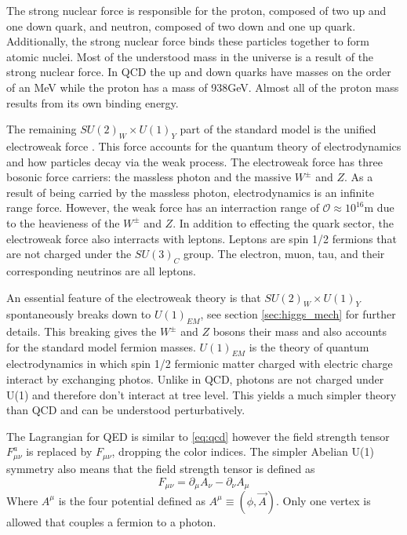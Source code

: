 The strong nuclear force is responsible for the proton, composed of two up and one down quark, and neutron, composed of two down and one up quark.
Additionally, the strong nuclear force binds these particles together to form atomic nuclei.
Most of the understood mass in the universe is a result of the strong nuclear force.
In QCD the up and down quarks have masses on the order of an MeV while the proton has a mass of 938GeV.
Almost all of the proton mass results from its own binding energy.

The remaining $SU(2)_W\times U(1)_Y$ part of the standard model is the unified electroweak force \cite{Salam:1964ry, Weinberg:1967tq, Guralnik:1964eu, PhysRevLett.13.508, Higgs1964132, Englert:1964et, Glashow1961579}.
This force accounts for the quantum theory of electrodynamics and how particles decay via the weak process.
The electroweak force has three bosonic force carriers: the massless photon and the massive $W^\pm$ and $Z$.
As a result of being carried by the massless photon, electrodynamics is an infinite range force.
However, the weak force has an interraction range of $\mathcal{O}\approx10^{16}$m due to the heavieness of the $W^{\pm}$ and $Z$.
In addition to effecting the quark sector, the electroweak force also interracts with leptons.
Leptons are spin 1/2 fermions that are not charged under the $SU(3)_C$ group. 
The electron, muon, tau, and their corresponding neutrinos are all leptons.

An essential feature of the electroweak theory is that $SU(2)_W\times U(1)_Y$ spontaneously breaks down to $U(1)_{EM}$, see section \ref{sec:higgs_mech} for further details.
This breaking gives the $W^\pm$ and $Z$ bosons their mass and also accounts for the standard model fermion masses.
$U(1)_{EM}$ is the theory of quantum electrodynamics in which spin 1/2 fermionic matter charged with electric charge interact by exchanging photos.
Unlike in QCD, photons are not charged under U(1) and therefore don't interact at tree level.
This yields a much simpler theory than QCD and can be understood perturbatively.

The Lagrangian for QED is similar to \ref{eq:qcd} however the field strength tensor $F^a_{\mu\nu}$ is replaced by $F_{\mu\nu}$, dropping the color indices.
The simpler Abelian U(1) symmetry also means that the field strength tensor is defined as
\begin{equation}
  F_{\mu\nu}=\partial_\mu A_\nu - \partial_\nu A_\mu
\end{equation}
Where $A^\mu$ is the four potential defined as $A^\mu \equiv (\phi, \vec{A})$.
Only one vertex is allowed that couples a fermion to a photon.

